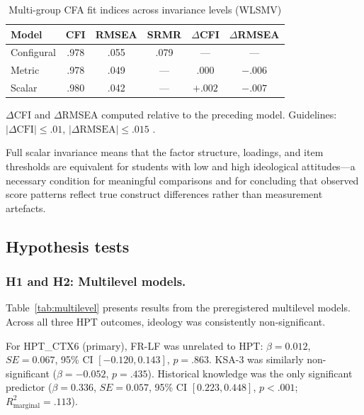 \documentclass[pdflatex,sn-apa]{sn-jnl}%
\begin{document}
\begin{table}[ht]
\caption{Multi-group CFA fit indices across invariance levels (WLSMV)}\label{tab:invariance}
\begin{tabular*}{\textwidth}{@{\extracolsep\fill}lccccc}
\toprule
Model & CFI & RMSEA & SRMR & $\Delta$CFI & $\Delta$RMSEA \\
\midrule
Configural & .978 & .055 & .079 & --- & --- \\
Metric & .978 & .049 & --- & .000 & $-.006$ \\
Scalar & .980 & .042 & --- & $+.002$ & $-.007$ \\
\bottomrule
\end{tabular*}
\begin{tablenotes}
\small
\item $\Delta$CFI and $\Delta$RMSEA computed relative to the preceding model. Guidelines: $|\Delta\text{CFI}| \leq .01$, $|\Delta\text{RMSEA}| \leq .015$ \citep{Chen2007}.
\end{tablenotes}
\end{table}

Full scalar invariance means that the factor structure, loadings, and item thresholds are equivalent for students with low and high ideological attitudes---a necessary condition for meaningful comparisons and for concluding that observed score patterns reflect true construct differences rather than measurement artefacts.

\subsection{Hypothesis tests}\label{subsec:hypotheses_tests}

\subsubsection{H1 and H2: Multilevel models.}\label{subsubsec:h1h2}

Table~\ref{tab:multilevel} presents results from the preregistered multilevel models. Across all three HPT outcomes, ideology was consistently non-significant.

For HPT\_CTX6 (primary), FR-LF was unrelated to HPT: $\beta = 0.012$, $SE = 0.067$, 95\% CI $[-0.120, 0.143]$, $p = .863$. KSA-3 was similarly non-significant ($\beta = -0.052$, $p = .435$). Historical knowledge was the only significant predictor ($\beta = 0.336$, $SE = 0.057$, 95\% CI $[0.223, 0.448]$, $p < .001$; $R^2_{\text{marginal}} = .113$).
\end{document}
